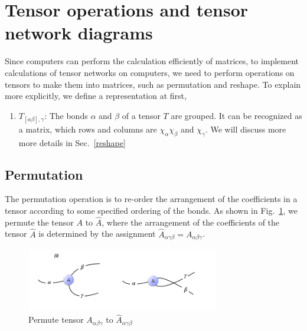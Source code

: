 \section{Tensor operations and tensor network diagrams} %
\label{operation}

Since computers can perform the calculation efficiently of matrices, to implement calculations of tensor networks on computers, we need to perform operations on tensors to make them into matrices, such as permutation and reshape. To explain more explicitly, we define a representation at first,


\begin{enumerate}
	\item $T_{[\alpha \beta], \gamma}$: The bonds $\alpha$ and $\beta$ of a tensor $T$ are grouped. It can be recognized as a matrix, which rows and columns are $\chi_{\alpha}\chi_{\beta}$ and $\chi_{\gamma}$. We will discuss more more details in Sec.~\ref{reshape}
\end{enumerate}

\subsection{Permutation}

The permutation operation is to re-order the arrangement of the coefficients in a tensor according to some specified ordering of the bonds. As shown in Fig.~\ref{fig224}, we permute the tensor $A$ to $\hat{A}$, where the arrangement of the coefficients of the tensor $\hat{A}$ is determined by the assignment $\hat{A}_{\alpha \gamma \beta} = A_{\alpha \beta \gamma}$.

\begin{figure}[H]
	\centering
	\includegraphics[width=0.75\textwidth]{figures/fig224.png}
	\caption[The permutation of a tensor.]{ Permute tensor $A_{\alpha \beta \gamma}$ to $\hat{A}_{\alpha \gamma \beta}$ }
	\label{fig224}
\end{figure}

